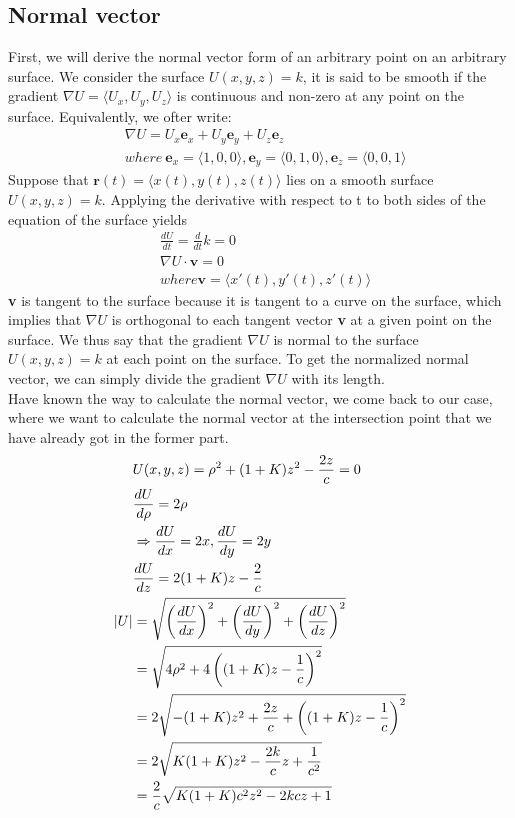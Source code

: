 \documentclass[../main.tex]{subfiles}
\begin{document}
	\subsection{Normal vector}
	First, we will derive the normal vector form of an arbitrary point on an arbitrary surface. We consider the surface $U(x,y,z)=k$, it is said to be smooth if the gradient $\nabla{U}=\langle U_x,U_y,U_z \rangle$ is continuous and non-zero at any point on the surface. Equivalently, we ofter write:
	\begin{align}
	&\nabla{U}=U_x\textbf{e}_x+U_y\textbf{e}_y+U_z\textbf{e}_z\\
	&where\ \textbf{e}_x=\langle 1,0,0 \rangle,\textbf{e}_y=\langle 0,1,0 \rangle,\textbf{e}_z=\langle 0,0,1 \rangle
	\end{align}
	Suppose that $\textbf{r}(t)=\langle x(t),y(t),z(t) \rangle$ lies on a smooth surface $U(x,y,z)=k$. Applying the derivative with respect to t to both sides of the equation of the surface yields
	\begin{align}
	&\frac{dU}{dt}=\frac{d}{dt}k=0\\
	&\nabla{U}\cdot\textbf{v}=0\\
	&where \textbf{v}=\langle x'(t),y'(t),z'(t) \rangle
	\end{align}
	\textbf{v} is tangent to the surface because it is tangent to a curve on the surface, which implies that $\nabla{U}$ is orthogonal to each tangent vector \textbf{v} at a given point on the surface. We thus say that the gradient $\nabla{U}$ is normal to the surface $U(x,y,z)=k$ at each point on the surface. To get the normalized normal vector, we can simply divide the gradient $\nabla{U}$ with its length.\\  
	Have known the way to calculate the normal vector, we come back to our case, where we want to calculate the normal vector at the intersection point that we have already got in the former part.
	\begin{align}
	&U(x,y,z)=\rho^2+(1+K)z^2-\frac{2z}{c}=0\\
	&\frac{dU}{d\rho}=2\rho\\
	&\Rightarrow \frac{dU}{dx}=2x, \frac{dU}{dy}=2y\\
	&\frac{dU}{dz}=2(1+K)z-\frac{2}{c}\\
	\left\lvert U\right\rvert&=\sqrt{\left(\frac{dU}{dx}\right)^2+\left(\frac{dU}{dy}\right)^2+\left(\frac{dU}{dz}\right)^2}\\
	&=\sqrt{4\rho^2+4\left((1+K)z-\frac{1}{c}\right)^2}\\
	&=2\sqrt{-(1+K)z^2+\frac{2z}{c}+\left((1+K)z-\frac{1}{c}\right)^2}\\
	&=2\sqrt{K(1+K)z^2-\frac{2k}{c}z+\frac{1}{c^2}}\\
	&=\frac{2}{c}\sqrt{K(1+K)c^2z^2-2kcz+1}
	\end{align}
\end{document}
